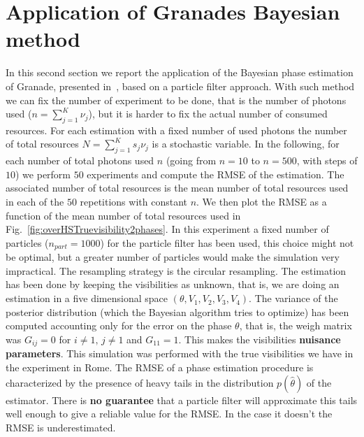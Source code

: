 \documentclass[aps, pra, 10pt, twocolumn, superscriptaddress,floatfix]{revtex4-1}
\begin{document}
\section{Application of Granades Bayesian method}
%
In this second section we report the application of the Bayesian phase estimation of Granade, presented in~\cite{Granade2012}, based on a particle filter approach. With such method we can fix the number of experiment to be done, that is the number of photons used ($n = \sum_{j=1}^{K} \nu_j$), but it is harder to fix the actual number of consumed resources. For each estimation with a fixed number of used photons the number of total resources $N = \sum_{j=1}^K s_j \nu_j$ is a stochastic variable. In the following, for each number of total photons used $n$ (going from $n=10$ to $n=500$, with steps of $10$) we perform $50$ experiments and compute the RMSE of the estimation.  The associated number of total resources is the mean number of total resources used in each of the $50$ repetitions with constant $n$. We then plot the RMSE as a function of the mean number of total resources used in Fig.~\ref{fig:overHSTruevisibility2phases}. In this experiment a fixed number of particles ($n_{part} = 1000$) for the particle filter has been used, this choice might not be optimal, but a greater number of particles would make the simulation very impractical. The resampling strategy is the circular resampling. The estimation has been done by keeping the visibilities as unknown, that is, we are doing an estimation in a five dimensional space $\left(\theta, V_1, V_2, V_3, V_4 \right)$. The variance of the posterior distribution (which the Bayesian algorithm tries to optimize) has been computed accounting only for the error on the phase $\theta$, that is, the weigh matrix was $G_{ij} = 0$ for $i \neq 1, \, j \neq 1$ and $G_{11} = 1$. This makes the visibilities \textbf{nuisance parameters}. This simulation was performed with the true visibilities we have in the experiment in Rome. The RMSE of a phase estimation procedure is characterized by the presence of heavy tails in the distribution $p(\hat{\theta})$ of the estimator. There is \textbf{no guarantee} that a particle filter will approximate this tails well enough to give a reliable value for the RMSE. In the case it doesn't the RMSE is underestimated.
%
\end{document}
